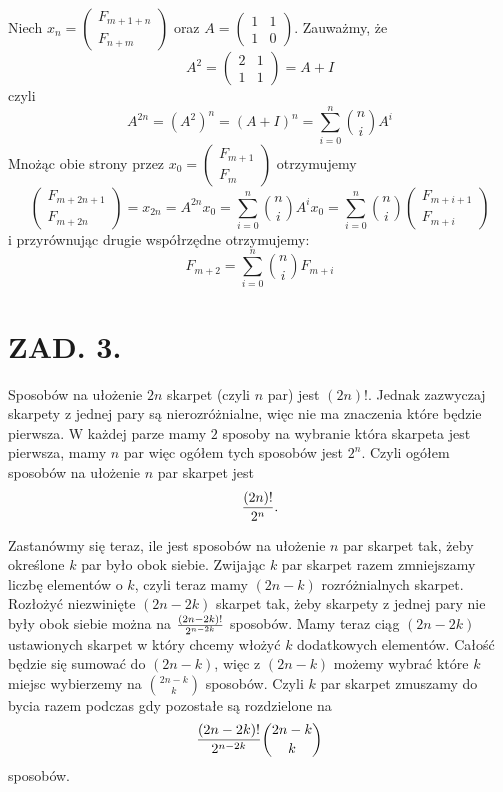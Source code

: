 \documentclass{article}[13pt]
\begin{document}
Niech $x_n=\begin{pmatrix}
    F_{m+1+n}\\F_{n+m}
\end{pmatrix}$ oraz $A=\begin{pmatrix}
    1&1\\1&0
\end{pmatrix}$. Zauważmy, że
$$A^2=\begin{pmatrix}
    2&1\\1&1
\end{pmatrix}=A+I$$
czyli
$$A^{2n}=(A^2)^n=(A+I)^n=\sum\limits_{i=0}^n{n\choose i}A^i$$
Mnożąc obie strony przez $x_0=\begin{pmatrix}
    F_{m+1}\\F_m
\end{pmatrix}$ otrzymujemy
$$\begin{pmatrix}F_{m+2n+1}\\F_{m+2n}\end{pmatrix}=x_{2n}=A^{2n}x_0=\sum\limits_{i=0}^n{n\choose i}A^ix_0=\sum\limits_{i=0}^n{n\choose i}\begin{pmatrix}
    F_{m+i+1}\\F_{m+i}
\end{pmatrix}$$
i przyrównując drugie współrzędne otrzymujemy:
$$F_{m+2}=\sum\limits_{i=0}^n{n\choose i}F_{m+i}$$


\section*{ZAD. 3.}

Sposobów na ułożenie $2n$ skarpet (czyli $n$ par) jest $(2n)!$. Jednak zazwyczaj skarpety z jednej pary są nierozróżnialne, więc nie ma znaczenia które będzie pierwsza. W każdej parze mamy $2$ sposoby na wybranie która skarpeta jest pierwsza, mamy $n$ par więc ogółem tych sposobów jest $2^n$. Czyli ogółem sposobów na ułożenie $n$ par skarpet jest
$${(2n)!\over 2^n}.$$

Zastanówmy się teraz, ile jest sposobów na ułożenie $n$ par skarpet tak, żeby określone $k$ par było obok siebie. Zwijając $k$ par skarpet razem zmniejszamy liczbę elementów o $k$, czyli teraz mamy $(2n-k)$ rozróżnialnych skarpet. Rozłożyć niezwinięte $(2n-2k)$ skarpet tak, żeby skarpety z jednej pary nie były obok siebie można na ${(2n-2k)!\over 2^{n-2k}}$ sposobów. Mamy teraz ciąg $(2n-2k)$ ustawionych skarpet w który chcemy włożyć $k$ dodatkowych elementów. Całość będzie się sumować do $(2n-k)$, więc z $(2n-k)$ możemy wybrać które $k$ miejsc wybierzemy na ${2n-k\choose k}$ sposobów. Czyli $k$ par skarpet zmuszamy do bycia razem podczas gdy pozostałe są rozdzielone na 
$${(2n-2k)!\over 2^{n-2k}}{2n-k\choose k}$$
sposobów.
\end{document}
